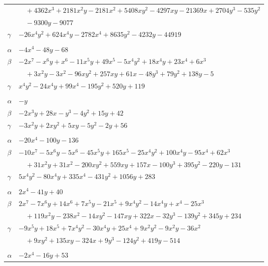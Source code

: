\documentclass[11pt]{article}
\begin{document}
\begin{longtable}{@{}ll@{}}
 & $\quad +4362x^{3}+2181x^{2}y-2181x^{2}+5408xy^{2}-4297xy-21369x+2704y^{3}-535y^{2}$\\
 & $\quad -9300y-9077$\\
$\gamma$ & $-26x^{4}y^{2}+624x^{4}y-2782x^{4}+8635y^{2}-4232y-44919$\\
\addlinespace[3pt]
\multicolumn{2}{@{}l}{$\{i,j\}=\{12,31\}$, $k_{ij}=2^{6}\cdot 3$}\\
$\alpha$ & $-4x^{4}-48y-68$\\
$\beta$ & $-2x^{7}-x^{6}y+x^{6}-11x^{5}y+49x^{5}-5x^{4}y^{2}+18x^{4}y+23x^{4}+6x^{3}$\\
 & $\quad +3x^{2}y-3x^{2}-96xy^{2}+257xy+61x-48y^{3}+79y^{2}+138y-5$\\
$\gamma$ & $x^{4}y^{2}-24x^{4}y+99x^{4}-195y^{2}+520y+119$\\
\addlinespace[3pt]
\multicolumn{2}{@{}l}{$\{i,j\}=\{13,27\}$, $k_{ij}=2\cdot 7^{2}$}\\
$\alpha$ & $-y$\\
$\beta$ & $-2x^{3}y+28x-y^{3}-4y^{2}+15y+42$\\
$\gamma$ & $-3x^{2}y+2xy^{2}+5xy-5y^{2}-2y+56$\\
\addlinespace[3pt]
\multicolumn{2}{@{}l}{$\{i,j\}=\{13,28\}$, $k_{ij}=2^{5}\cdot 3^{2}$}\\
$\alpha$ & $-20x^{4}-100y-136$\\
$\beta$ & $-10x^{7}-5x^{6}y-5x^{6}-45x^{5}y+165x^{5}-25x^{4}y^{2}+100x^{4}y-95x^{4}+62x^{3}$\\
 & $\quad +31x^{2}y+31x^{2}-200xy^{2}+559xy+157x-100y^{3}+395y^{2}-220y-131$\\
$\gamma$ & $5x^{4}y^{2}-80x^{4}y+335x^{4}-431y^{2}+1056y+283$\\
\addlinespace[3pt]
\multicolumn{2}{@{}l}{$\{i,j\}=\{14,26\}$, $k_{ij}=2\cdot 3$}\\
$\alpha$ & $2x^{4}-41y+40$\\
$\beta$ & $2x^{7}-7x^{6}y+14x^{6}+7x^{5}y-21x^{5}+9x^{4}y^{2}-14x^{4}y+x^{4}-25x^{3}$\\
 & $\quad +119x^{2}y-238x^{2}-14xy^{2}-147xy+322x-32y^{3}-139y^{2}+345y+234$\\
$\gamma$ & $-9x^{5}y+18x^{5}+7x^{4}y^{2}-30x^{4}y+25x^{4}+9x^{2}y^{2}-9x^{2}y-36x^{2}$\\
 & $\quad +9xy^{2}+135xy-324x+9y^{3}-124y^{2}+419y-514$\\
\addlinespace[3pt]
\multicolumn{2}{@{}l}{$\{i,j\}=\{14,35\}$, $k_{ij}=2^{2}\cdot 3^{2}$}\\
$\alpha$ & $-2x^{4}-16y+53$\\

\end{longtable}
\end{document}
